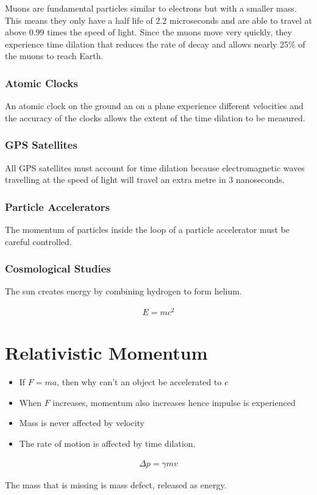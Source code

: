		Muons are fundamental particles similar to electrons but with a smaller mass. This means they only have a half life of 2.2 microseconds and are able to travel at above 0.99 times the speed of light. Since the muons move very quickly, they experience time dilation that reduces the rate of decay and allows nearly 25\% of the muons to reach Earth.

	\subsubsection{Atomic Clocks}
	
		An atomic clock on the ground an on a plane experience different velocities and the accuracy of the clocks allows the extent of the time dilation to be measured.

	\subsubsection{GPS Satellites}
	
		All GPS satellites must account for time dilation because electromagnetic waves travelling at the speed of light will travel an extra metre in 3 nanoseconds.

	\subsubsection{Particle Accelerators}
	
		The momentum of particles inside the loop of a particle accelerator must be careful controlled.

	\subsubsection{Cosmological Studies}
	
		The sun creates energy by combining hydrogen to form helium.

		\begin{align*}
			E = mc^2
		\end{align*}

\section{Relativistic Momentum} \label{26/06/2025}

	\begin{itemize}
		\item If $F=ma$, then why can't an object be accelerated to $c$
		\item When $F$ increases, momentum also increases hence impulse is experienced
		\item Mass is never affected by velocity
		\item The rate of motion is affected by time dilation.
	\end{itemize}

	\begin{align*}
		\Delta p = \gamma m v
	\end{align*}

	The mass that is missing is mass defect, released as energy.
